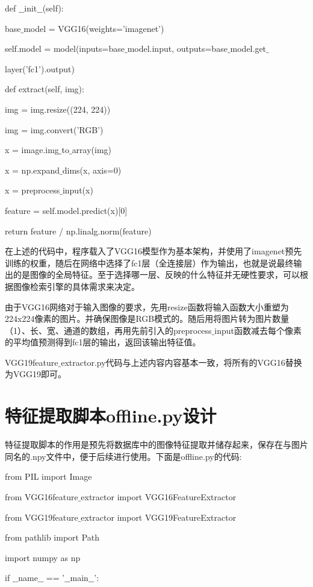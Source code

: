 \documentclass[bachelor_p]{hdu-thesis}
\begin{document}
\qquad def $\_$$\_$init$\_$$\_$(self):

\qquad \qquad base$\_$model = VGG16(weights='imagenet')

\qquad \qquad self.model = model(inputs=base$\_$model.input, outputs=base$\_$model.get$\_$

\qquad \qquad layer('fc1').output)

\qquad def extract(self, img):

\qquad \qquad img = img.resize((224, 224))

\qquad \qquad img = img.convert('RGB')

\qquad \qquad x = image.img$\_$to$\_$array(img)

\qquad \qquad x = np.expand$\_$dims(x, axis=0)

\qquad \qquad x = preprocess$\_$input(x)

\qquad \qquad feature = self.model.predict(x)[0]

\qquad \qquad return feature / np.linalg.norm(feature)

在上述的代码中，程序载入了VGG16模型作为基本架构，并使用了imagenet预先训练的权重，随后在网络中选择了fc1层（全连接层）作为输出，也就是说最终输出的是图像的全局特征。至于选择哪一层、反映的什么特征并无硬性要求，可以根据图像检索引擎的具体需求来决定。

由于VGG16网络对于输入图像的要求，先用resize函数将输入函数大小重塑为224x224像素的图片。并确保图像是RGB模式的。随后用将图片转为图片数量（1）、长、宽、通道的数组，再用先前引入的preprocess$\_$input函数减去每个像素的平均值预测得到fc1层的输出，返回该输出特征值。

VGG19feature$\_$extractor.py代码与上述内容内容基本一致，将所有的VGG16替换为VGG19即可。

\section {特征提取脚本offline.py设计}

特征提取脚本的作用是预先将数据库中的图像特征提取并储存起来，保存在与图片同名的.npy文件中，便于后续进行使用。下面是offline.py的代码:

from PIL import Image

from VGG16feature$\_$extractor import VGG16FeatureExtractor

from VGG19feature$\_$extractor import VGG19FeatureExtractor

from pathlib import Path

import numpy as np

if $\_$$\_$name$\_$$\_$ == '$\_$$\_$main$\_$$\_$':
\end{document}

